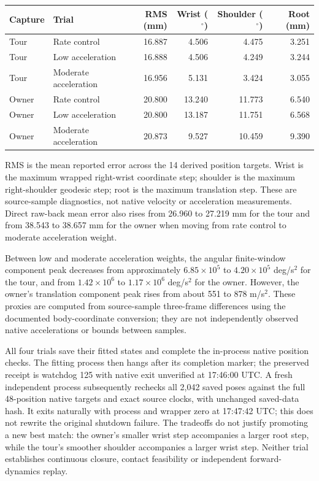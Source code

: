 \documentclass[11pt,a4paper]{article}
\begin{document}
\begin{center}
\small
\begin{tabular}{llrrrr}
\toprule
Capture & Trial & RMS (mm) & Wrist ($^\circ$) & Shoulder ($^\circ$) & Root (mm)\\
\midrule
Tour & Rate control & 16.887 & 4.506 & 4.475 & 3.251\\
Tour & Low acceleration & 16.888 & 4.506 & 4.249 & 3.244\\
Tour & Moderate acceleration & 16.956 & 5.131 & 3.424 & 3.055\\
Owner & Rate control & 20.800 & 13.240 & 11.773 & 6.540\\
Owner & Low acceleration & 20.800 & 13.187 & 11.751 & 6.568\\
Owner & Moderate acceleration & 20.873 & 9.527 & 10.459 & 9.390\\
\bottomrule
\end{tabular}
\end{center}
RMS is the mean reported error across the 14 derived position targets.
Wrist is the maximum wrapped right-wrist coordinate step; shoulder is the
maximum right-shoulder geodesic step; root is the maximum translation step.
These are source-sample diagnostics, not native velocity or acceleration
measurements. Direct raw-back mean error also rises from 26.960 to
27.219 mm for the tour and from 38.543 to 38.657 mm for the owner when
moving from rate control to moderate acceleration weight.

Between low and moderate acceleration weights, the angular finite-window
component peak decreases from approximately $6.85\times10^5$ to
$4.20\times10^5$ deg/s$^2$ for the tour, and from $1.42\times10^6$ to
$1.17\times10^6$ deg/s$^2$ for the owner. However, the owner's translation
component peak rises from about 551 to 878 m/s$^2$. These proxies are
computed from source-sample three-frame differences using the documented
body-coordinate conversion; they are not independently observed native
accelerations or bounds between samples.

All four trials save their fitted states and complete the in-process native
position checks. The fitting process then hangs after its completion marker;
the preserved receipt is watchdog 125 with native exit unverified at
17:46:00 UTC. A fresh independent process subsequently rechecks all 2,042
saved poses against the full 48-position native targets and exact source
clocks, with unchanged saved-data hash. It exits naturally with process and
wrapper zero at 17:47:42 UTC; this does not rewrite the original shutdown
failure. The tradeoffs do not justify promoting a new
best match: the owner's smaller wrist step accompanies a larger root step,
while the tour's smoother shoulder accompanies a larger wrist step. Neither
trial establishes continuous closure, contact feasibility or independent
forward-dynamics replay.
\end{document}
